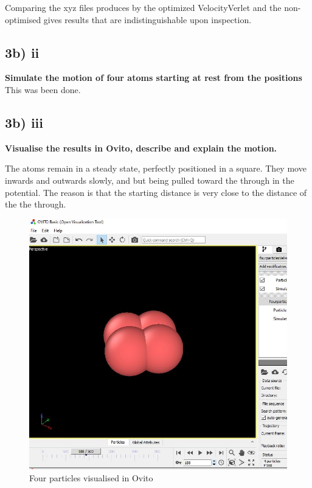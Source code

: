 Comparing the xyz files produces by the optimized VelocityVerlet and the non-optimised gives results that are indistinguishable upon inspection.

\subsection*{3b) ii}
\textbf{Simulate the motion of four atoms starting at rest from the positions}
This was been done.

\subsection*{3b) iii}
\textbf{Visualise the results in Ovito, describe and explain the motion.}

The atoms remain in a steady state, perfectly positioned in a square. They move inwards and outwards slowly, and but being pulled toward the through in the potential. The reason is that the starting distance is very close to the distance of the the through.


\begin{figure}[h!]
        \centering 
        \includegraphics[scale=0.6]{./py/3biii_ovito.jpg} 
        \caption{Four particles visualised in Ovito}
        \label{fig:3biii}
\end{figure}


